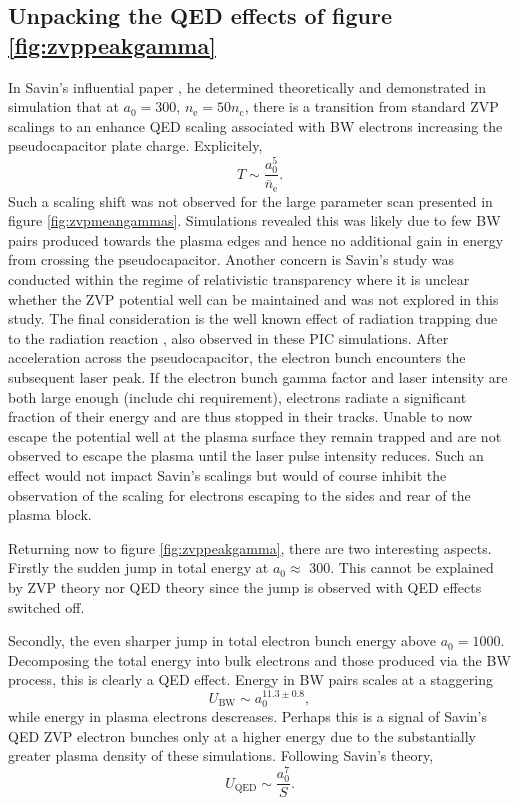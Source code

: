 \subsection{Unpacking the QED effects of figure \ref{fig:zvppeakgamma}}
In Savin's influential paper \cite{savin_2019_EnergyAbsorptionLaserQED}, he determined theoretically and demonstrated in simulation that at $a_0 = 300$, $n_\mathrm{e} = 50 n_\mathrm{c}$, there is a transition from standard ZVP scalings to an enhance QED scaling associated with \ac{BW} electrons increasing the pseudocapacitor plate charge. Explicitely,
\begin{equation}
	T \sim \frac{a^5_0}{\bar{n}_\mathrm{e}}.
\end{equation}
Such a scaling shift was not observed for the large parameter scan presented in figure \ref{fig:zvpmeangammas}. Simulations revealed this was likely due to few \ac{BW} pairs produced towards the plasma edges and hence no additional gain in energy from crossing the pseudocapacitor. Another concern is Savin's study was conducted within the regime of relativistic transparency where it is unclear whether the ZVP potential well can be maintained and was not explored in this study. The final consideration is the well known effect of radiation trapping due to the radiation reaction \cite{jiRadiationReactionTrappingElectrons2014}, also observed in these PIC simulations. After acceleration across the pseudocapacitor, the electron bunch encounters the subsequent laser peak. If the electron bunch gamma factor and laser intensity are both large enough (include chi requirement), electrons radiate a significant fraction of their energy and are thus stopped in their tracks. Unable to now escape the potential well at the plasma surface they remain trapped and are not observed to escape the plasma until the laser pulse intensity reduces. Such an effect would not impact Savin's scalings but would of course inhibit the observation of the scaling for electrons escaping to the sides and rear of the plasma block.

Returning now to figure \ref{fig:zvppeakgamma}, there are two interesting aspects. Firstly the sudden jump in total energy at $a_0 \approx$ 300. This cannot be explained by ZVP theory nor QED theory since the jump is observed with QED effects switched off. 

Secondly, the even sharper jump in total electron bunch energy above $a_0 = 1000$. Decomposing the total energy into bulk electrons and those produced via the BW process, this is clearly a QED effect. Energy in BW pairs scales at a staggering
\begin{equation}
	U_\mathrm{BW} \sim a^{11.3\pm 0.8}_0,
\end{equation}
while energy in plasma electrons descreases. Perhaps this is a signal of Savin's QED ZVP electron bunches only at a higher energy due to the substantially greater plasma density of these simulations. Following Savin's theory,
\begin{equation}
	U_\mathrm{QED} \sim \frac{a^7_0}{S}.
\end{equation}


